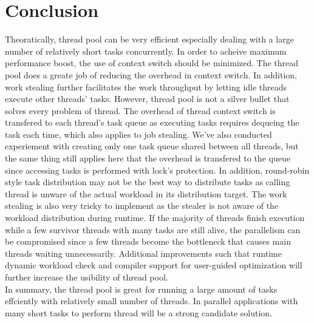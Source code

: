 \documentclass[journal, a4paper]{IEEEtran}
\begin{document}
\section{Conclusion}
	Theoratically, thread pool can be very efficient especially dealing with a large number of relatively short tasks concurrently. In order to acheive maximum performance boost, the use of context switch should be minimized. The thread pool does a greate job of reducing the overhead in context switch. In addition, work stealing further facilitates the work throughput by letting idle threads execute other threads' tasks. However, thread pool is not a silver bullet that solves every problem of thread. The overhead of thread context switch is transfered to each thread's task queue as executing tasks requires dequeing the task each time, which also applies to job stealing. We've also conducted experiement with creating only one task queue shared between all threads, but the same thing still applies here that the overhead is transfered to the queue since accessing tasks is performed with lock's protection. In addition, round-robin style task distribution may not be the best way to distribute tasks as calling thread is unware of the actual workload in its distribution target. The work stealing is also very tricky to implement as the stealer is not aware of the workload distribution during runtime. If the majority of threads finish execution while a few survivor threads with many tasks are still alive, the parallelism can be compromised since a few threads become the bottleneck that causes main threads waiting unnecessarily. Additional improvements such that runtime dynamic workload check and compiler support for user-guided optimization will further increase the usibility of thread pool.\\
	
	In summary, the thread pool is great for running a large amount of tasks effciently with relatively small number of threads. In parallel applications with many short tasks to perform thread will be a strong candidate solution.


\end{document}
